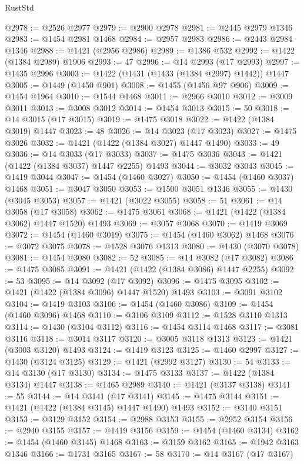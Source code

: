\begin{lexlean}{RustStd}
\begin{coremodule}
@2978 := @2526 @2977
@2979 := @2900 @2978
@2981 := @2445 @2979 @1346
@2983 := @1454 @2981 @1468
@2984 := @2957 @2983
@2986 := @2443 @2984 @1346
@2988 := @1421 (@2956 @2986)
@2989 := @1386 @532
@2992 := @1422 (@1384 @2989) @1906
@2993 := 47
@2996 := @14 @2993 (@17 @2993)
@2997 := @1435 @2996
@3003 := @1422 (@1431 (@1433 (@1384 @2997) @1442)) @1447
@3005 := @1449 (@1450 @901)
@3008 := @1455 (@1456 @97 @906)
@3009 := @1454 @1964
@3010 := @1544 @1468
@3011 := @2966 @3010
@3012 := @3009 @3011
@3013 := @3008 @3012
@3014 := @1454 @3013
@3015 := 50
@3018 := @14 @3015 (@17 @3015)
@3019 := @1475 @3018
@3022 := @1422 (@1384 @3019) @1447
@3023 := 48
@3026 := @14 @3023 (@17 @3023)
@3027 := @1475 @3026
@3032 := @1421 (@1422 (@1384 @3027) @1447 @1490)
@3033 := 49
@3036 := @14 @3033 (@17 @3033)
@3037 := @1475 @3036
@3043 := @1421 (@1422 (@1384 @3037) @1447 @2255) @1493
@3044 := @3032 @3043
@3045 := @1419 @3044
@3047 := @1454 (@1460 @3027)
@3050 := @1454 (@1460 @3037) @1468
@3051 := @3047 @3050
@3053 := @1500 @3051 @1346
@3055 := @1430 (@3045 @3053)
@3057 := @1421 (@3022 @3055)
@3058 := 51
@3061 := @14 @3058 (@17 @3058)
@3062 := @1475 @3061
@3068 := @1421 (@1422 (@1384 @3062) @1447 @1520) @1493
@3069 := @3057 @3068
@3070 := @1419 @3069
@3072 := @1454 (@1460 @3019)
@3075 := @1454 (@1460 @3062) @1468
@3076 := @3072 @3075
@3078 := @1528 @3076 @1313
@3080 := @1430 (@3070 @3078)
@3081 := @1454 @3080
@3082 := 52
@3085 := @14 @3082 (@17 @3082)
@3086 := @1475 @3085
@3091 := @1421 (@1422 (@1384 @3086) @1447 @2255)
@3092 := 53
@3095 := @14 @3092 (@17 @3092)
@3096 := @1475 @3095
@3102 := @1421 (@1422 (@1384 @3096) @1447 @1520) @1493
@3103 := @3091 @3102
@3104 := @1419 @3103
@3106 := @1454 (@1460 @3086)
@3109 := @1454 (@1460 @3096) @1468
@3110 := @3106 @3109
@3112 := @1528 @3110 @1313
@3114 := @1430 (@3104 @3112)
@3116 := @1454 @3114 @1468
@3117 := @3081 @3116
@3118 := @3014 @3117
@3120 := @3005 @3118 @1313
@3123 := @1421 (@3003 @3120) @1493
@3124 := @1419 @3123
@3125 := @1460 @2997
@3127 := @1430 (@3124 @3125)
@3129 := @1421 (@2992 @3127)
@3130 := 54
@3133 := @14 @3130 (@17 @3130)
@3134 := @1475 @3133
@3137 := @1422 (@1384 @3134) @1447
@3138 := @1465 @2989
@3140 := @1421 (@3137 @3138)
@3141 := 55
@3144 := @14 @3141 (@17 @3141)
@3145 := @1475 @3144
@3151 := @1421 (@1422 (@1384 @3145) @1447 @1490) @1493
@3152 := @3140 @3151
@3153 := @3129 @3152
@3154 := @2988 @3153
@3155 := @2952 @3154
@3156 := @2940 @3155
@3157 := @1419 @3156
@3159 := @1454 (@1460 @3134)
@3162 := @1454 (@1460 @3145) @1468
@3163 := @3159 @3162
@3165 := @1942 @3163 @1346
@3166 := @1731 @3165
@3167 := 58
@3170 := @14 @3167 (@17 @3167)

\end{coremodule}
\end{lexlean}
